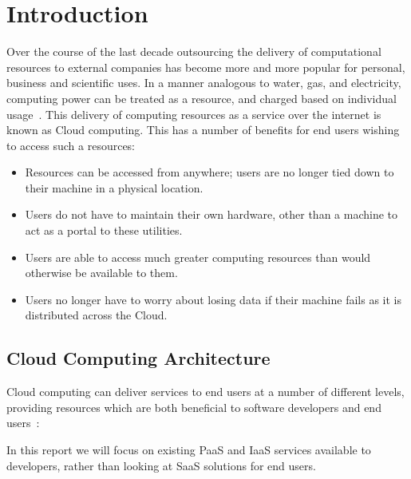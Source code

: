 \chapter{Introduction}
Over the course of the last decade outsourcing the delivery of computational resources to external companies has become more and more popular for personal, business and scientific uses. In a manner analogous to water, gas, and electricity, computing power can be treated as a resource, and charged based on individual usage~\cite{Aneka}. This delivery of computing resources as a service over the internet is known as Cloud computing. This has a number of benefits for end users wishing to access such a resources:
\begin{itemize}
\item Resources can be accessed from anywhere; users are no longer tied down to their machine in a physical location.
\item Users do not have to maintain their own hardware, other than a machine to act as a portal to these utilities.
\item Users are able to access much greater computing resources than would otherwise be available to them.
\item Users no longer have to worry about losing data if their machine fails as it is distributed across the Cloud.
\end{itemize}

\section{Cloud Computing Architecture}
Cloud computing can deliver services to end users at a number of different levels, providing resources which are both beneficial to software developers and end users~\cite{Aneka}:
\begin{itemize}
\end{itemize}

In this report we will focus on existing PaaS and IaaS services available to developers, rather than looking at SaaS solutions for end users.
